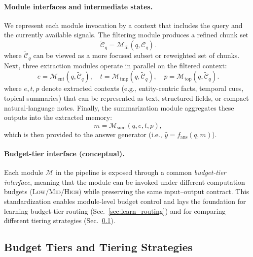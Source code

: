 \paragraph{Module interfaces and intermediate states.}
We represent each module invocation by a context that includes the query and the currently available signals.
The filtering module produces a refined chunk set
\begin{equation}
\tilde{\mathcal{C}}_q = \mathcal{M}_{\text{fil}}(q, \mathcal{C}_q).
\end{equation}
where $\tilde{\mathcal{C}}_q$ can be viewed as a more focused subset or reweighted set of chunks.
Next, three extraction modules operate in parallel on the filtered context:
\begin{equation}
e = \mathcal{M}_{\text{ent}}(q, \tilde{\mathcal{C}}_q), \quad
t = \mathcal{M}_{\text{tmp}}(q, \tilde{\mathcal{C}}_q), \quad
p = \mathcal{M}_{\text{top}}(q, \tilde{\mathcal{C}}_q).
\end{equation}
where $e,t,p$ denote extracted contexts (e.g., entity-centric facts, temporal cues, topical summaries) that can be represented as text, structured fields, or compact natural-language notes.
Finally, the summarization module aggregates these outputs into the extracted memory:
\begin{equation}
m = \mathcal{M}_{\text{sum}}(q, e, t, p),
\end{equation}
which is then provided to the answer generator (i.e., $\hat{y}=f_{\text{ans}}(q,m)$).



\paragraph{Budget-tier interface (conceptual).}
Each module $\mathcal{M}$ in the pipeline is exposed through a common \emph{budget-tier interface}, meaning that the module can be invoked under different computation budgets (\textsc{Low}/\textsc{Mid}/\textsc{High}) while preserving the same input--output contract. 
This standardization enables module-level budget control and lays the foundation for learning budget-tier routing (Sec.~\ref{sec:learn_routing}) and for comparing different tiering strategies (Sec.~\ref{sec:budget_tier}).







\subsection{Budget Tiers and Tiering Strategies}
\label{sec:budget_tier}

